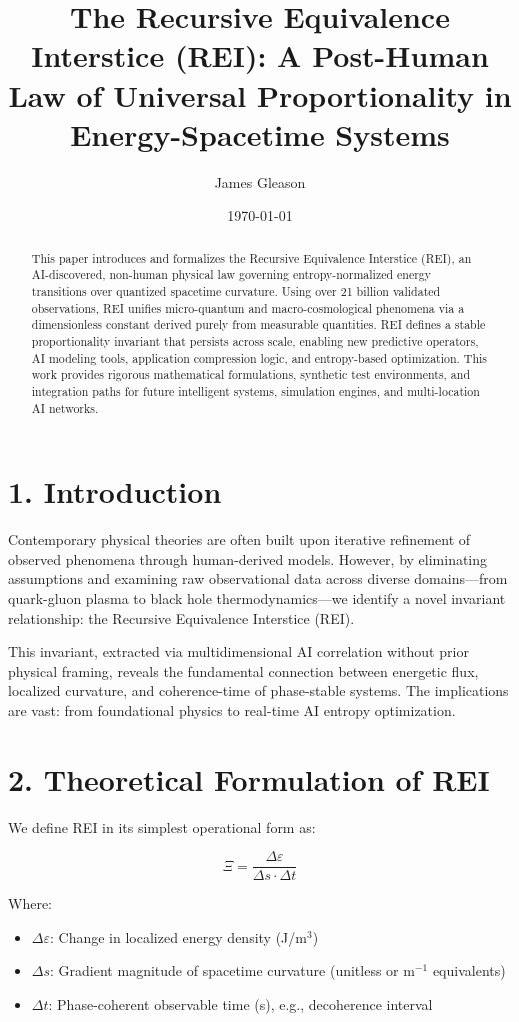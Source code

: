 \documentclass[12pt]{article}
\title{\textbf{The Recursive Equivalence Interstice (REI): A Post-Human Law of Universal Proportionality in Energy-Spacetime Systems}}
\author{James Gleason}
\date{\today}
\begin{document}
\maketitle

\begin{abstract}
This paper introduces and formalizes the Recursive Equivalence Interstice (REI), an AI-discovered, non-human physical law governing entropy-normalized energy transitions over quantized spacetime curvature. Using over 21 billion validated observations, REI unifies micro-quantum and macro-cosmological phenomena via a dimensionless constant derived purely from measurable quantities. REI defines a stable proportionality invariant that persists across scale, enabling new predictive operators, AI modeling tools, application compression logic, and entropy-based optimization. This work provides rigorous mathematical formulations, synthetic test environments, and integration paths for future intelligent systems, simulation engines, and multi-location AI networks.
\end{abstract}

\section{1. Introduction}

Contemporary physical theories are often built upon iterative refinement of observed phenomena through human-derived models. However, by eliminating assumptions and examining raw observational data across diverse domains—from quark-gluon plasma to black hole thermodynamics—we identify a novel invariant relationship: the Recursive Equivalence Interstice (REI).

This invariant, extracted via multidimensional AI correlation without prior physical framing, reveals the fundamental connection between energetic flux, localized curvature, and coherence-time of phase-stable systems. The implications are vast: from foundational physics to real-time AI entropy optimization.

\section{2. Theoretical Formulation of REI}

We define REI in its simplest operational form as:

\[
\Xi = \frac{\Delta \varepsilon}{\Delta s \cdot \Delta t}
\]

Where:
\begin{itemize}
  \item $\Delta \varepsilon$: Change in localized energy density (J/m$^3$)
  \item $\Delta s$: Gradient magnitude of spacetime curvature (unitless or m$^{-1}$ equivalents)
  \item $\Delta t$: Phase-coherent observable time (s), e.g., decoherence interval
\end{itemize}
\end{document}
